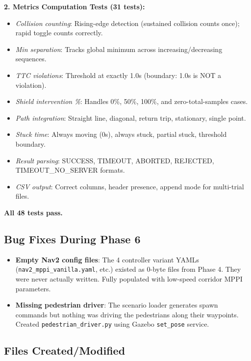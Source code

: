 \documentclass[11pt]{article}
\begin{document}
\textbf{2. Metrics Computation Tests (31 tests):}
\begin{itemize}
  \item \emph{Collision counting}: Rising-edge detection (sustained collision counts once); rapid toggle counts correctly.
  \item \emph{Min separation}: Tracks global minimum across increasing/decreasing sequences.
  \item \emph{TTC violations}: Threshold at exactly 1.0s (boundary: 1.0s is NOT a violation).
  \item \emph{Shield intervention \%}: Handles 0\%, 50\%, 100\%, and zero-total-samples cases.
  \item \emph{Path integration}: Straight line, diagonal, return trip, stationary, single point.
  \item \emph{Stuck time}: Always moving (0s), always stuck, partial stuck, threshold boundary.
  \item \emph{Result parsing}: SUCCESS, TIMEOUT, ABORTED, REJECTED, TIMEOUT\_NO\_SERVER formats.
  \item \emph{CSV output}: Correct columns, header presence, append mode for multi-trial files.
\end{itemize}

\textbf{All 48 tests pass.}

\subsection*{Bug Fixes During Phase 6}

\begin{itemize}
  \item \textbf{Empty Nav2 config files}: The 4 controller variant YAMLs (\texttt{nav2\_mppi\_vanilla.yaml}, etc.) existed as 0-byte files from Phase 4. They were never actually written. Fully populated with low-speed corridor MPPI parameters.
  \item \textbf{Missing pedestrian driver}: The scenario loader generates spawn commands but nothing was driving the pedestrians along their waypoints. Created \texttt{pedestrian\_driver.py} using Gazebo \texttt{set\_pose} service.
\end{itemize}

\subsection*{Files Created/Modified}
\end{document}
